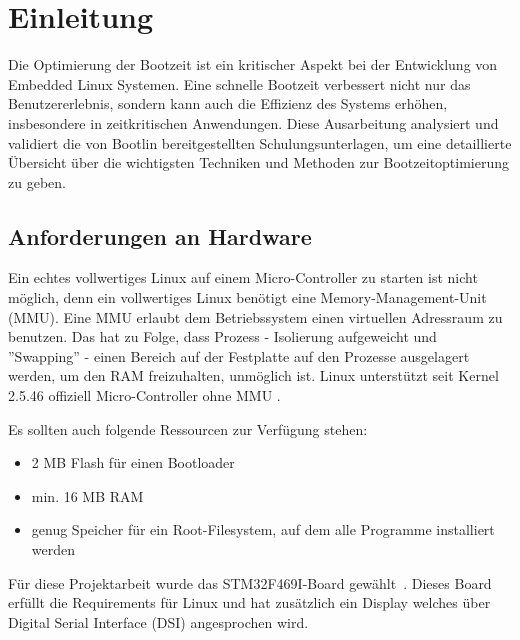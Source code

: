 
\section{Einleitung}
Die Optimierung der Bootzeit ist ein kritischer Aspekt bei der Entwicklung von Embedded Linux Systemen. Eine
schnelle Bootzeit verbessert nicht nur das Benutzererlebnis, sondern kann auch die Effizienz des Systems
erhöhen, insbesondere in zeitkritischen Anwendungen. Diese Ausarbeitung analysiert und validiert die von
Bootlin bereitgestellten Schulungsunterlagen, um eine detaillierte Übersicht über die wichtigsten Techniken
und Methoden zur Bootzeitoptimierung zu geben.

\subsection{Anforderungen an Hardware}
Ein echtes vollwertiges Linux auf einem Micro-Controller zu starten ist nicht möglich,
denn ein vollwertiges Linux benötigt eine Memory-Management-Unit (MMU). Eine MMU
erlaubt dem Betriebssystem einen virtuellen Adressraum zu benutzen. Das hat zu Folge,
dass Prozess - Isolierung aufgeweicht und ''Swapping'' - einen Bereich auf der
Festplatte auf den Prozesse ausgelagert werden, um den RAM freizuhalten,
unmöglich ist. Linux unterstützt seit Kernel 2.5.46 offiziell Micro-Controller ohne
MMU \cite{uCLinuxWikipedia}.

Es sollten auch folgende Ressourcen zur Verfügung stehen:
\begin{itemize}
	\item 2 MB Flash für einen Bootloader
	\item min. 16 MB RAM
	\item genug Speicher für ein Root-Filesystem, auf dem alle Programme installiert werden
\end{itemize}


Für diese Projektarbeit wurde das STM32F469I-Board gewählt~\cite{stmWebsiteBoard}.
Dieses Board erfüllt die Requirements für Linux und hat zusätzlich ein Display welches
über Digital Serial Interface (DSI) angesprochen wird.

